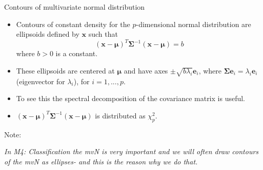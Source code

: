 \documentclass[ignorenonframetext,]{beamer}
\begin{document}
\begin{frame}

\begin{block}{Contours of multivariate normal distribution}

\vspace{2mm}

\begin{itemize}
\item
  Contours of constant density for the \(p\)-dimensional normal
  distribution are ellipsoids defined by \(\boldsymbol{x}\) such that
  \[ (\boldsymbol{x}-\boldsymbol{\mu})^T\boldsymbol\Sigma^{-1}(\boldsymbol{x}-\boldsymbol{\mu})=b \]
  where \(b>0\) is a constant.
\item
  These ellipsoids are centered at \(\boldsymbol{\mu}\) and have axes
  \(\pm \sqrt{b \lambda_i}\boldsymbol{e}_i\), where
  \(\boldsymbol\Sigma\boldsymbol{e}_i=\lambda_i \boldsymbol{e}_i\)
  (eigenvector for \(\lambda_i\)), for \(i=1,...,p\).
\item
  To see this the spectral decomposition of the covariance matrix is
  useful.
\item
  \((\boldsymbol{x}-\boldsymbol{\mu})^T\boldsymbol\Sigma^{-1}(\boldsymbol{x}-\boldsymbol{\mu})\)
  is distributed as \(\chi^2_p\).
\end{itemize}

\end{block}

\end{frame}

\begin{frame}

Note:

\emph{In M4: Classification the mvN is very important and we will often
draw contours of the mvN as ellipses- and this is the reason why we do
that. }

\end{frame}
\end{document}
